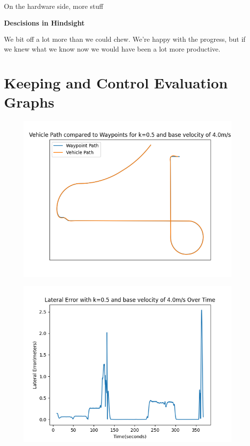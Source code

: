 \documentclass[titlepage,draft]{article}
\begin{document}
{On the hardware side, more stuff

\textbf{Descisions in Hindsight}

We bit off a lot more than we could chew. We're happy with the progress, but if we knew what we know now we would have been a lot more productive.

\printbibliography
\vspace{12pt}

\appendix

\section{Keeping and Control Evaluation Graphs}
\label{FirstAppendix}

\begin{figure}[H]
	\centering
	\begin{minipage}{.45\textwidth}
		\centering
		\includegraphics[width=\linewidth]{waypoints_k-05_v-4.png}
		\label{fig:wayk5v4}
	\end{minipage}%
	\hspace{0.1\textwidth}%
	\begin{minipage}{.45\textwidth}
		\centering
		\includegraphics[width=\linewidth]{lateral_k-05_v-4.png}

\end{minipage}
\end{figure}}
\end{document}
